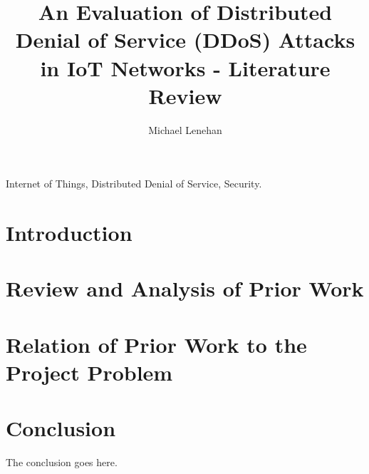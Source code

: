 \documentclass[a4paper, journal]{IEEEtran}
\begin{document}
\hypersetup{pageanchor=false}

\hypersetup{pageanchor=true}
\title{An Evaluation of Distributed Denial of Service (DDoS) Attacks in IoT
Networks - Literature Review}
\author{Michael Lenehan}

%
{}

\maketitle

\begin{abstract}
	
\end{abstract}

\begin{IEEEkeywords}
	Internet of Things, Distributed Denial of Service, Security.
\end{IEEEkeywords}

\section{Introduction}


\section{Review and Analysis of Prior Work}


\section{Relation of Prior Work to the Project Problem}


\section{Conclusion}
The conclusion goes here.


\printbibliography
\end{document}
